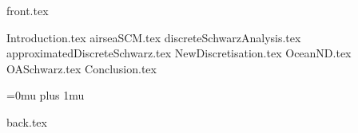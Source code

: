 



\newcommand{\currentlabel}{}
\let\oldlabel\label
\renewcommand{\label}[1]{\oldlabel{#1}\renewcommand{\currentlabel}{#1}}

\newcommand{\currentlabelchapter}{}
\newcommand{\labelchapter}[1]{\label{#1}\renewcommand{\currentlabelchapter}{#1}}


\newcommand{\mySub}[2]{{\noindent\bf#2}\tabto*{#1}}


\sloppy %

{front.tex}

\mainmatter
{Introduction.tex}
{airseaSCM.tex}
{discreteSchwarzAnalysis.tex}
{approximatedDiscreteSchwarz.tex}
{NewDiscretisation.tex}
{OceanND.tex}
{OASchwarz.tex}
{Conclusion.tex}


\backmatter
\clearpage
{}
{}
\Urlmuskip=0mu plus 1mu\relax


{back.tex}


